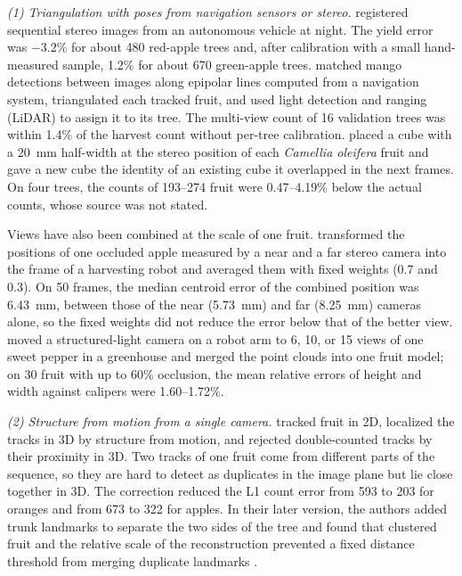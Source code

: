 \textit{(1) Triangulation with poses from navigation sensors or stereo.} \citet{wang2013automated} registered sequential stereo images from an autonomous vehicle at night. The yield error was $-3.2$\% for about 480 red-apple trees and, after calibration with a small hand-measured sample, 1.2\% for about 670 green-apple trees. \citet{stein2016image} matched mango detections between images along epipolar lines computed from a navigation system, triangulated each tracked fruit, and used light detection and ranging (LiDAR) to assign it to its tree. The multi-view count of 16 validation trees was within 1.4\% of the harvest count without per-tree calibration. \citet{wu2025counting} placed a cube with a 20~mm half-width at the stereo position of each \textit{Camellia oleifera} fruit and gave a new cube the identity of an existing cube it overlapped in the next frames. On four trees, the counts of 193--274 fruit were 0.47--4.19\% below the actual counts, whose source was not stated.

Views have also been combined at the scale of one fruit. \citet{li2022multi} transformed the positions of one occluded apple measured by a near and a far stereo camera into the frame of a harvesting robot and averaged them with fixed weights (0.7 and 0.3). On 50 frames, the median centroid error of the combined position was 6.43~mm, between those of the near (5.73~mm) and far (8.25~mm) cameras alone, so the fixed weights did not reduce the error below that of the better view. \citet{wang2024multi} moved a structured-light camera on a robot arm to 6, 10, or 15 views of one sweet pepper in a greenhouse and merged the point clouds into one fruit model; on 30 fruit with up to 60\% occlusion, the mean relative errors of height and width against calipers were 1.60--1.72\%.

\textit{(2) Structure from motion from a single camera.} \citet{liu2018robust} tracked fruit in 2D, localized the tracks in 3D by structure from motion, and rejected double-counted tracks by their proximity in 3D. Two tracks of one fruit come from different parts of the sequence, so they are hard to detect as duplicates in the image plane but lie close together in 3D. The correction reduced the L1 count error from 593 to 203 for oranges and from 673 to 322 for apples. In their later version, the authors added trunk landmarks to separate the two sides of the tree and found that clustered fruit and the relative scale of the reconstruction prevented a fixed distance threshold from merging duplicate landmarks \citep{liu2019monocular}.

